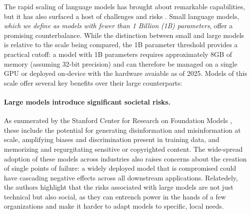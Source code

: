 
The rapid scaling of language models has brought about remarkable capabilities, but it has also surfaced a host of challenges and risks \citep{bommasani2021foundation}. Small language models, \textit{which we define as models with fewer than 1 Billion (1B) parameters}, offer a promising counterbalance. While the distinction between small and large models is relative to the scale being compared, the 1B parameter threshold provides a practical cutoff: a model with 1B parameters requires approximately 8GB of memory (assuming 32-bit precision) and can therefore be managed on a single GPU or deployed on-device with the hardware avaiable as of 2025. Models of this scale offer several key benefits over their large counterparts:

\paragraph{Large models introduce significant societal risks.} As enumerated by the Stanford Center for Research on Foundation Models \citet{bommasani2021foundation}, these include the potential for generating disinformation and misinformation at scale, amplifying biases and discrimination present in training data, and memorizing and regurgitating sensitive or copyrighted content. The wide-spread adoption of these models across industries also raises concerns about the creation of single points of failure: a widely deployed model that is compromised could have cascading negative effects across all downstream applications. Relatedely, the authors highlight that the risks associated with large models are not just technical but also social, as they can entrench power in the hands of a few organizations and make it harder to adapt models to specific, local needs.

